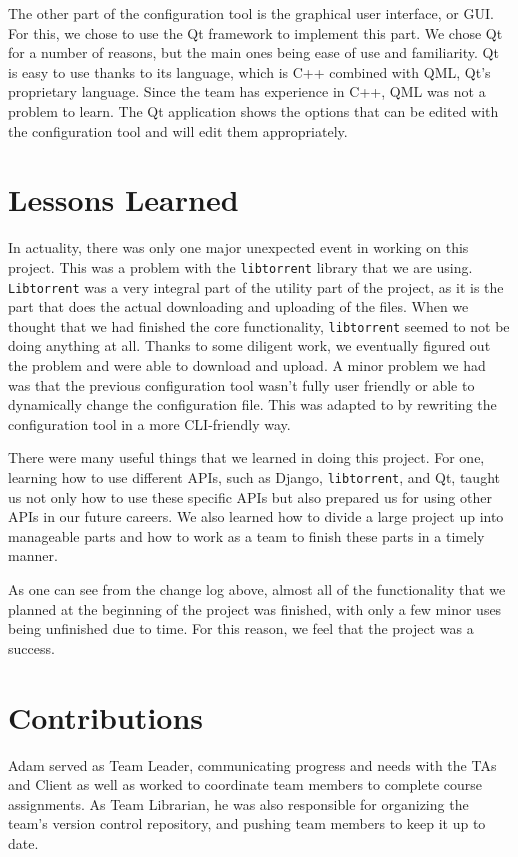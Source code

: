 \documentclass[12 pt]{article}
\begin{document}
	The other part of the configuration tool is the graphical user interface, or GUI. For this, we chose to use the Qt framework to implement this part. We chose Qt for a number of reasons, but the main ones being ease of use and familiarity. Qt is easy to use thanks to its language, which is C++ combined with QML, Qt's proprietary language. Since the team has experience in C++, QML was not a problem to learn. The Qt application shows the options that can be edited with the configuration tool and will edit them appropriately.
	
	\section{Lessons Learned}
	
	In actuality, there was only one major unexpected event in working on this project. This was a problem with the \texttt{libtorrent} library that we are using. \texttt{Libtorrent} was a very integral part of the utility part of the project, as it is the part that does the actual downloading and uploading of the files. When we thought that we had finished the core functionality, \texttt{libtorrent} seemed to not be doing anything at all. Thanks to some diligent work, we eventually figured out the problem and were able to download and upload. A minor problem we had was that the previous configuration tool wasn't fully user friendly or able to dynamically change the configuration file. This was adapted to by rewriting the configuration tool in a more CLI-friendly way.
	
	There were many useful things that we learned in doing this project. For one, learning how to use different APIs, such as Django, \texttt{libtorrent}, and Qt, taught us not only how to use these specific APIs but also prepared us for using other APIs in our future careers. We also learned how to divide a large project up into manageable parts and how to work as a team to finish these parts in a timely manner.
	
	As one can see from the change log above, almost all of the functionality that we planned at the beginning of the project was finished, with only a few minor uses being unfinished due to time. For this reason, we feel that the project was a success.
	
	\section{Contributions}
	Adam served as Team Leader, communicating progress and needs with the TAs and Client as well as worked to coordinate team members to complete course assignments. As Team Librarian, he was also responsible for organizing the team's version control repository, and pushing team members to keep it up to date.
	
\end{document}
